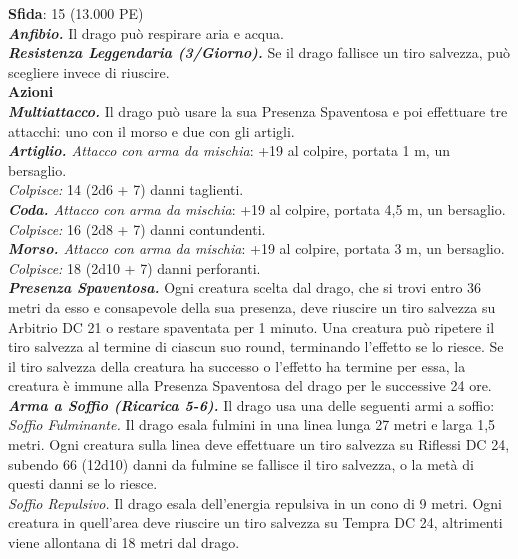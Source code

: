 \begin{multicols}{2}
\textbf{Sfida}: 15 (13.000 PE)\smallskip\\
\emph{\textbf{Anfibio.}} Il drago può respirare aria e acqua.\\
\emph{\textbf{Resistenza Leggendaria (3/Giorno).}} Se il drago fallisce un tiro salvezza, può scegliere invece di riuscire.\\
\smallskip\textbf{Azioni}\\
\emph{\textbf{Multiattacco.}} Il drago può usare la sua Presenza Spaventosa e poi effettuare tre attacchi: uno con il morso e due con gli artigli.\\
\emph{\textbf{Artiglio.} Attacco con arma da mischia}: +19 al colpire, portata 1 m, un bersaglio.\\
\emph{Colpisce:} 14 (2d6 + 7) danni taglienti.\\
\emph{\textbf{Coda.} Attacco con arma da mischia}: +19 al colpire, portata 4,5 m, un bersaglio.\\
\emph{Colpisce:} 16 (2d8 + 7) danni contundenti.\\
\emph{\textbf{Morso.} Attacco con arma da mischia}: +19 al colpire, portata 3 m, un bersaglio.\\
\emph{Colpisce:} 18 (2d10 + 7) danni perforanti.\\
\emph{\textbf{Presenza Spaventosa.}} Ogni creatura scelta dal drago, che si trovi entro 36 metri da esso e consapevole della sua presenza, deve riuscire un tiro salvezza su Arbitrio DC  21 o restare spaventata per 1 minuto. Una creatura può ripetere il tiro salvezza al termine di ciascun suo round, terminando l'effetto se lo riesce. Se il tiro salvezza della creatura ha successo o l'effetto ha termine per essa, la creatura è immune alla Presenza Spaventosa del drago per le successive 24 ore.\\
\emph{\textbf{Arma a Soffio (Ricarica 5-6).}} Il drago usa una delle seguenti armi a soffio:\\
\emph{Soffio Fulminante.} Il drago esala fulmini in una linea lunga 27 metri e larga 1,5 metri. Ogni creatura sulla linea deve effettuare un tiro salvezza su Riflessi DC  24, subendo 66 (12d10) danni da fulmine se fallisce il tiro salvezza, o la metà di questi danni se lo riesce.\\
\emph{Soffio Repulsivo.} Il drago esala dell'energia repulsiva in un cono di 9 metri. Ogni creatura in quell'area deve riuscire un tiro salvezza su Tempra DC  24, altrimenti viene allontana di 18 metri dal drago.\\


\end{multicols}
